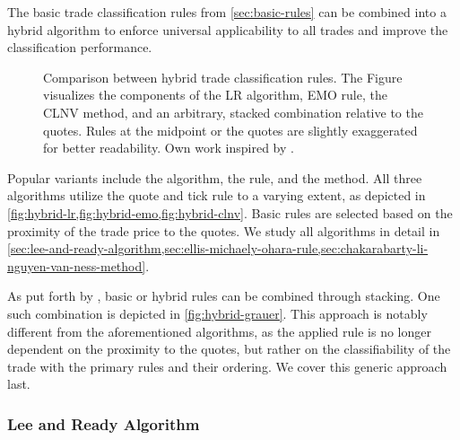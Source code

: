 The basic trade classification rules from \cref{sec:basic-rules} can be combined into a hybrid algorithm to enforce universal applicability to all trades and improve the classification performance.


\begin{figure}[ht!]
\hfill
{}
\hfill\null
\caption[Comparison Between Hybrid Trade Classification Rules]{Comparison between hybrid trade classification rules. The Figure visualizes the components of the \acrshort{LR} algorithm, \acrshort{EMO} rule, the \acrshort{CLNV} method, and an arbitrary, stacked combination relative to the quotes. Rules at the midpoint or the quotes are slightly exaggerated for better readability. Own work inspired by \textcite[][167]{poppeSensitivityVPINChoice2016}.}
\label{fig:hybrid-algorithms}
\end{figure}

Popular variants include the  algorithm, the  rule, and the  method. All three algorithms utilize the quote and tick rule to a varying extent, as depicted in \cref{fig:hybrid-lr,fig:hybrid-emo,fig:hybrid-clnv}. Basic rules are selected based on the proximity of the trade price to the quotes. We study all algorithms in detail in \cref{sec:lee-and-ready-algorithm,sec:ellis-michaely-ohara-rule,sec:chakarabarty-li-nguyen-van-ness-method}.


As put forth by \textcite[][18]{grauerOptionTradeClassification2022}, basic or hybrid rules can be combined through stacking. One such combination is depicted in \cref{fig:hybrid-grauer}. This approach is notably different from the aforementioned algorithms, as the applied rule is no longer dependent on the proximity to the quotes, but rather on the classifiability of the trade with the primary rules and their ordering. We cover this generic approach last.

\subsubsection{Lee and Ready Algorithm}\label{sec:lee-and-ready-algorithm}

